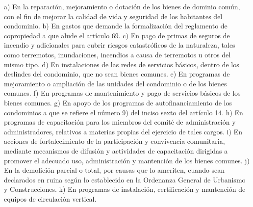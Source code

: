     a) En la reparación, mejoramiento o dotación de los bienes de dominio común, con el fin de mejorar la calidad de vida y seguridad de los habitantes del condominio.
    b) En gastos que demande la formalización del reglamento de copropiedad a que alude el artículo 69.
    c) En pago de primas de seguros de incendio y adicionales para cubrir riesgos catastróficos de la naturaleza, tales como terremotos, inundaciones, incendios a causa de terremotos u otros del mismo tipo.
    d) En instalaciones de las redes de servicios básicos, dentro de los deslindes del condominio, que no sean bienes comunes.
    e) En programas de mejoramiento o ampliación de las unidades del condominio o de los bienes comunes.
    f) En programas de mantenimiento y pago de servicios básicos de los bienes comunes.
    g) En apoyo de los programas de autofinanciamiento de los condominios a que se refiere el número 9) del inciso sexto del artículo 14.
    h) En programas de capacitación para los miembros del comité de administración y administradores, relativos a materias propias del ejercicio de tales cargos.
    i) En acciones de fortalecimiento de la participación y convivencia comunitaria, mediante mecanismos de difusión y actividades de capacitación dirigidas a promover el adecuado uso, administración y mantención de los bienes comunes.
    j) En la demolición parcial o total, por causas que lo ameriten, cuando sean declarados en ruina según lo establecido en la Ordenanza General de Urbanismo y Construcciones.
    k) En programas de instalación, certificación y mantención de equipos de circulación vertical.
     
